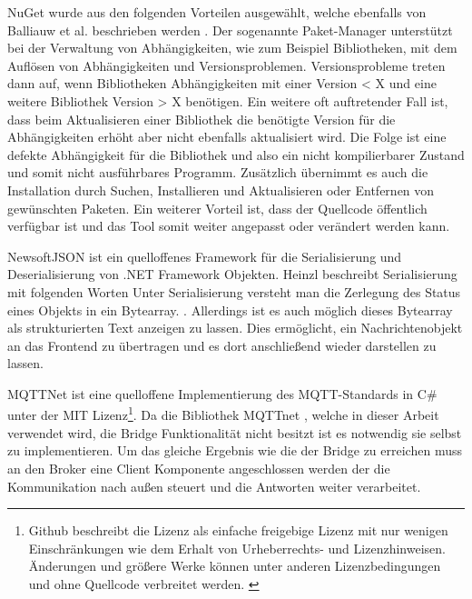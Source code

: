     
    NuGet wurde aus den folgenden Vorteilen ausgewählt, welche ebenfalls von Balliauw et al. beschrieben werden \cite{balliauw2012pro}.
    Der sogenannte Paket-Manager unterstützt bei der Verwaltung von Abhängigkeiten, wie zum Beispiel Bibliotheken, mit dem Auflösen von Abhängigkeiten und Versionsproblemen. Versionsprobleme treten dann auf, wenn Bibliotheken Abhängigkeiten mit einer Version < X und eine weitere Bibliothek Version > X benötigen. Ein weitere oft auftretender Fall ist, dass beim Aktualisieren einer Bibliothek die benötigte Version für die Abhängigkeiten erhöht aber nicht ebenfalls aktualisiert wird. Die Folge ist eine defekte Abhängigkeit für die Bibliothek und also ein nicht kompilierbarer Zustand  und somit nicht ausführbares Programm. Zusätzlich übernimmt es auch die Installation durch Suchen, Installieren und Aktualisieren oder Entfernen von gewünschten Paketen. Ein weiterer Vorteil ist, dass der Quellcode öffentlich verfügbar ist und das Tool somit weiter angepasst oder verändert werden kann.
    
    NewsoftJSON \cite{newton_king_2013} ist ein quelloffenes Framework für die Serialisierung und Deserialisierung von .NET Framework Objekten.
    Heinzl beschreibt Serialisierung mit folgenden Worten \glqq Unter Serialisierung versteht man die Zerlegung des Status eines Objekts in ein Bytearray.\grqq{} \cite{Heinzl2005}. Allerdings ist es auch möglich dieses Bytearray als strukturierten Text anzeigen zu lassen.
    Dies ermöglicht, ein Nachrichtenobjekt an das Frontend zu übertragen und es dort anschließend wieder darstellen zu lassen.
    
    MQTTNet ist eine quelloffene Implementierung des \ac{MQTT}-Standards in C\# unter der MIT Lizenz\footnote{
    Github beschreibt die Lizenz als einfache freigebige Lizenz mit nur wenigen Einschränkungen wie dem Erhalt von Urheberrechts- und Lizenzhinweisen. Änderungen und größere Werke können unter anderen Lizenzbedingungen und ohne Quellcode verbreitet werden. \cite{github_inc_2019}}.
    Da die Bibliothek MQTTnet \cite{chkr1011_2018},
    welche in dieser Arbeit verwendet wird, die Bridge Funktionalität nicht besitzt ist es notwendig sie selbst zu implementieren. Um das gleiche Ergebnis wie die der Bridge zu erreichen muss an den Broker eine Client Komponente angeschlossen werden der die Kommunikation nach außen steuert und die Antworten weiter verarbeitet. 
    
